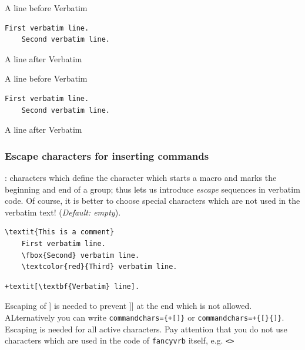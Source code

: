 \documentclass[twoside]{article}
\providecommand\optname[1]{\textsf{#1}}
\newenvironment{optlist}{\begin{description}%
  \renewcommand\makelabel[1]{%
    \descriptionlabel{\mdseries\optname{##1}}}%
  \itemsep0.25\itemsep}%
 {\end{description}}
\begin{document}
\begin{SideBySideExample}
  A line before Verbatim
  \begin{Verbatim}[frame=lines,label=foo]
    First verbatim line.
    Second verbatim line.
  \end{Verbatim}
  A line after Verbatim
\end{SideBySideExample}

\begin{SideBySideExample}
  A line before Verbatim
  \begin{Verbatim}[frame=lines,label=foo,
                   vspace=0pt]
    First verbatim line.
    Second verbatim line.
  \end{Verbatim}
  A line after Verbatim
\end{SideBySideExample}




\subsubsection{Escape characters for inserting commands}

\begin{optlist}
  \item[commandchars (three characters)]: characters which define the
  character which starts a macro and marks the beginning and end of a group;
  thus lets us introduce \emph{escape} sequences in verbatim code. Of
  course, it is better to choose special characters which are not used in
  the verbatim text! (\emph{Default: empty}).
  \label{sec:commandchars}
\end{optlist}

\begin{SideBySideExample}
  \begin{Verbatim}[commandchars=\\\{\}]
    \textit{This is a comment}
    First verbatim line.
    \fbox{Second} verbatim line.
    \textcolor{red}{Third} verbatim line.
  \end{Verbatim}

  \begin{Verbatim}[commandchars=+\[\]]
    +textit[\textbf{Verbatim} line].
  \end{Verbatim}
\end{SideBySideExample}


Escaping of ] is needed to prevent ]] at the end which is not allowed. ALternatively
you can write \verb|commandchars={+[]}| or \verb|commandchars=+{[}{]}|. Escaping is needed
for all active characters. Pay attention that you do not use characters which are used
in the code of \texttt{fancyvrb} itself, e.g. \verb|<>|
\end{document}
